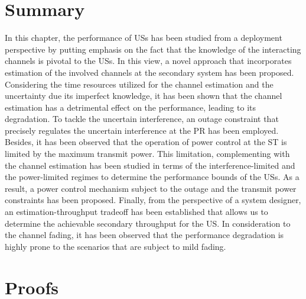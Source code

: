 \section{Summary} \label{sec_US:conc}
In this chapter, the performance of USs has been studied from a deployment perspective by putting emphasis on the fact that the knowledge of the interacting channels is pivotal to the USs. In this view, a novel approach that incorporates estimation of the involved channels at the secondary system has been proposed. Considering the time resources utilized for the channel estimation and the uncertainty due its imperfect knowledge, it has been shown that the channel estimation has a detrimental effect on the performance, leading to its degradation. To tackle the uncertain interference, an outage constraint that precisely regulates the uncertain interference at the PR has been employed. Besides, it has been observed that the operation of power control at the ST is limited by the maximum transmit power. This limitation, complementing with the channel estimation has been studied in terms of the interference-limited and the power-limited regimes to determine the performance bounds of the USs. As a result, a power control mechanism subject to the outage and the transmit power constraints has been proposed. Finally, from the perspective of a system designer, an estimation-throughput tradeoff has been established that allows us to determine the achievable secondary throughput for the US. In consideration to the channel fading, it has been observed that the performance degradation is highly prone to the scenarios that are subject to mild fading. 

\section{Proofs}
